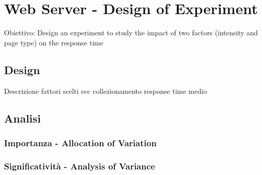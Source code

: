 \chapter{Web Server - Design of Experiment}
Obiettivo: Design an experiment to study the impact of two factors (intensity and page type) on the response time
\section{Design}
Descrizione fattori scelti ecc 
collezionamento response time medio
\section{Analisi}
\subsection{Importanza - Allocation of Variation}
\subsection{Significatività - Analysis of Variance}
